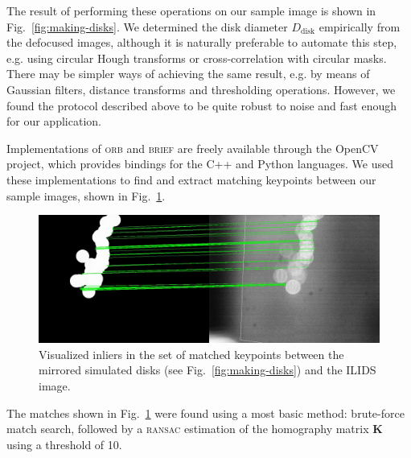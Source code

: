 \documentclass[11.5pt,oneside]{book}
\newcommand*{\figref}[1]{Fig.~\ref{#1}}
\begin{document}
The result of performing these operations on our sample image is shown in \figref{fig:making-disks}. We determined the disk diameter $D_\text{disk}$
empirically from the defocused images, although it is naturally preferable to
automate this step, e.g. using circular Hough transforms or cross-correlation
with circular masks. There may be simpler ways of achieving the same result,
e.g. by means of Gaussian filters, distance transforms and thresholding
operations. However, we found the protocol described above to be quite robust to
noise and fast enough for our application.

Implementations of \textsc{orb} and \textsc{brief} are freely available through
the OpenCV project, which provides bindings for the C++ and Python languages. We
used these implementations to find and extract matching keypoints between our
sample images, shown in \figref{fig:matching}.

\begin{figure}
    \centering
    \includegraphics[width=\textwidth]{img/orb/asift-matching.jpg}
    \caption{Visualized inliers in the set of matched keypoints between the
    mirrored simulated disks (see \figref{fig:making-disks}) and the ILIDS image. \label{fig:matching}}
\end{figure}

The matches shown in \figref{fig:matching} were found using a most basic
method: brute-force match search, followed by a \textsc{ransac} estimation of the
homography matrix $\mathbf{K}$ using a threshold of 10.
\end{document}
